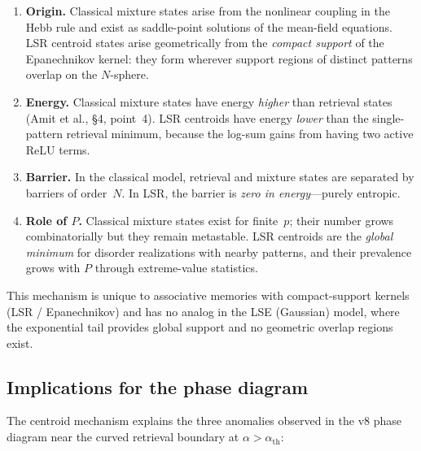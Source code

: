 \documentclass[11pt]{article}
\begin{document}
\begin{enumerate}
\item \textbf{Origin.}  Classical mixture states arise from the nonlinear coupling in the Hebb rule and exist as saddle-point solutions of the mean-field equations.  LSR centroid states arise geometrically from the \emph{compact support} of the Epanechnikov kernel: they form wherever support regions of distinct patterns overlap on the $N$-sphere.

\item \textbf{Energy.}  Classical mixture states have energy \emph{higher} than retrieval states (Amit et al., \S4, point~4).  LSR centroids have energy \emph{lower} than the single-pattern retrieval minimum, because the log-sum gains from having two active ReLU terms.

\item \textbf{Barrier.}  In the classical model, retrieval and mixture states are separated by barriers of order~$N$.  In LSR, the barrier is \emph{zero in energy}---purely entropic.

\item \textbf{Role of $P$.}  Classical mixture states exist for finite~$p$; their number grows combinatorially but they remain metastable.  LSR centroids are the \emph{global minimum} for disorder realizations with nearby patterns, and their prevalence grows with $P$ through extreme-value statistics.
\end{enumerate}

This mechanism is unique to associative memories with compact-support kernels (LSR / Epanechnikov) and has no analog in the LSE (Gaussian) model, where the exponential tail provides global support and no geometric overlap regions exist.

\subsection{Implications for the phase diagram}

The centroid mechanism explains the three anomalies observed in the v8 phase diagram near the curved retrieval boundary at $\alpha > \alpha_{\mathrm{th}}$:
\end{document}
